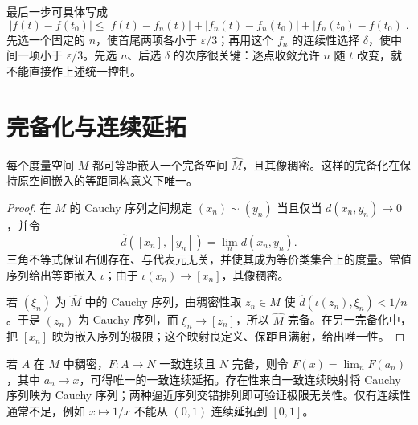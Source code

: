 最后一步可具体写成
\[
 |f(t)-f(t_0)|\leq |f(t)-f_n(t)|
 +|f_n(t)-f_n(t_0)|+|f_n(t_0)-f(t_0)|.
\]
先选一个固定的 $n$，使首尾两项各小于 $\varepsilon/3$；再用这个 $f_n$ 的连续性选择 $\delta$，使中间一项小于 $\varepsilon/3$。先选 $n$、后选 $\delta$ 的次序很关键：逐点收敛允许 $n$ 随 $t$ 改变，就不能直接作上述统一控制。

\section{完备化与连续延拓}
\begin{theorem}[完备化]
每个度量空间 $M$ 都可等距嵌入一个完备空间 $\widehat M$，且其像稠密。这样的完备化在保持原空间嵌入的等距同构意义下唯一。
\end{theorem}
\begin{proof}
在 $M$ 的 Cauchy 序列之间规定 $(x_n)\sim(y_n)$ 当且仅当 $d(x_n,y_n)\to0$，并令
\[
 \widehat d([x_n],[y_n])=\lim_n d(x_n,y_n).
\]
三角不等式保证右侧存在、与代表元无关，并使其成为等价类集合上的度量。常值序列给出等距嵌入 $\iota$；由于 $\iota(x_n)\to[x_n]$，其像稠密。

若 $(\xi_n)$ 为 $\widehat M$ 中的 Cauchy 序列，由稠密性取 $z_n\in M$ 使 $\widehat d(\iota(z_n),\xi_n)<1/n$。于是 $(z_n)$ 为 Cauchy 序列，而 $\xi_n\to[z_n]$，所以 $\widehat M$ 完备。在另一完备化中，把 $[x_n]$ 映为嵌入序列的极限；这个映射良定义、保距且满射，给出唯一性。
\end{proof}

若 $A$ 在 $M$ 中稠密，$F:A\to N$ 一致连续且 $N$ 完备，则令 $\overline F(x)=\lim_nF(a_n)$，其中 $a_n\to x$，可得唯一的一致连续延拓。存在性来自一致连续映射将 Cauchy 序列映为 Cauchy 序列；两种逼近序列交错排列即可验证极限无关性。仅有连续性通常不足，例如 $x\mapsto1/x$ 不能从 $(0,1)$ 连续延拓到 $[0,1]$。

